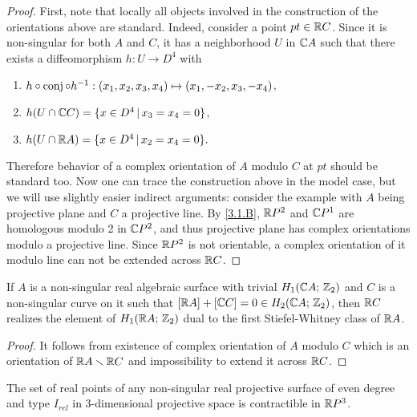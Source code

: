 \documentclass{article}
\numberwithin{equation}{section}
\begin{document}
\begin{proof} First, note that locally all objects involved in the
construction of the orientations above are standard. Indeed, consider a
point $pt\in\mathbb R C$. Since it is non-singular for both $A$ and
$C$, it has a neighborhood $U$ in $\mathbb C A$ such that there exists a
diffeomorphism $h:U\to D^4$ with 
\begin{enumerate} 
\item $h\circ\operatorname{conj}\circ h^{-1}:(x_1,x_2,x_3,x_4)\mapsto(x_1,-x_2,x_3,-x_4)$,
\item $h(U\cap\mathbb C C)=\{x\in D^4\,|\,x_3=x_4=0\}$,
\item $h(U\cap\mathbb R A)=\{x\in D^4\,|\, x_2=x_4=0\}.$
\end{enumerate}
Therefore behavior of a complex orientation of $A$ modulo $C$
at $pt$ should be standard too. Now one can trace the construction
above in the model case, but we will use slightly easier indirect
arguments: consider the example with $A$ being projective plane and $C$
a projective line.  By \ref{3.1.B}, $\mathbb R P^2$ and $\mathbb C P^1$ are homologous modulo
2 in $\mathbb C P^2$, and thus projective plane has complex orientations modulo
a projective line.  Since $\mathbb R P^2$ is not orientable, a complex
orientation of it modulo line can not be extended across $\mathbb R C$.
% 
\end{proof}

\begin{cor}\label{3.2.C} If $A$ is a non-singular real algebraic
surface with trivial $H_1(\mathbb C A;\,\mathbb Z_2)$ and $C$  is a non-singular
curve on it such that $[\mathbb R A]+[\mathbb C C]=0\in H_2(\mathbb C A;\,\mathbb Z_2)$,
then $\mathbb R C$ realizes the element of $H_1(\mathbb R A;\,\mathbb Z_2)$ dual to the first
Stiefel-Whitney class of $\mathbb R A$. \end{cor}

\begin{proof} It follows from existence of complex orientation of $A$
modulo $C$ which is an orientation of $\mathbb R A \smallsetminus\mathbb R C$ and
impossibility to extend it across $\mathbb R C$. %
\end{proof}

\begin{cor}\label{3.2.D} The set of real points of any non-singular
real projective surface of even degree and type $I_{rel}$ in
3-dimensional projective space is contractible in $\mathbb R P^3$. \end{cor}
\end{document}
